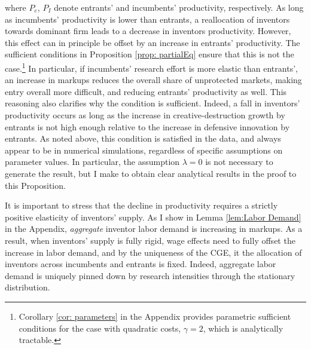 where $P_{e}$, $P_{I}$ denote entrants' and incumbents' productivity,
respectively. As long as incumbents' productivity is lower than entrants,
a reallocation of inventors towards dominant firm leads to a decrease
in inventors productivity. However, this effect can in principle be
offset by an increase in entrants' productivity. The sufficient conditions
in Proposition \ref{prop: partialEq} ensure that this is not the
case.\footnote{Corollary \ref{cor: parameters} in the Appendix provides parametric
sufficient conditions for the case with quadratic costs, $\gamma=2$,
which is analytically tractable.} In particular, if incumbents' research effort is more elastic than
entrants', an increase in markups reduces the overall share of unprotected
markets, making entry overall more difficult, and reducing entrants'
productivity as well. This reasoning also clarifies why the condition
is sufficient. Indeed, a fall in inventors' productivity occurs as
long as the increase in creative-destruction growth by entrants is
not high enough relative to the increase in defensive innovation by
entrants. As noted above, this condition is satisfied in the data,
and always appear to be in numerical simulations, regardless of specific
assumptions on parameter values. In particular, the assumption $\lambda=0$
is not necessary to generate the result, but I make to obtain clear
analytical results in the proof to this Proposition. 

It is important to stress that the decline in productivity requires
a strictly positive elasticity of inventors' supply. As I show in
Lemma \ref{lem:Labor Demand} in the Appendix, \emph{aggregate} inventor
labor demand is increasing in markups. As a result, when inventors'
supply is fully rigid, wage effects need to fully offset the increase
in labor demand, and by the uniqueness of the CGE, it the allocation
of inventors across incumbents and entrants is fixed. Indeed, aggregate
labor demand is uniquely pinned down by research intensities through
the stationary distribution. 

